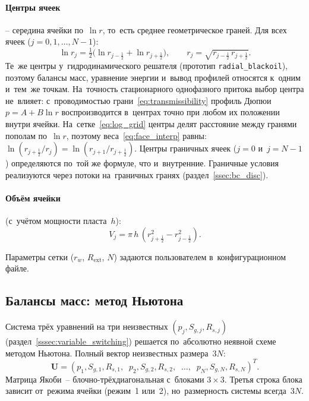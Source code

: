 \documentclass[12pt,a4paper]{article}
\newcommand{\half}{\tfrac{1}{2}}
\newcommand{\rw}{r_w}
\newcommand{\Rext}{R_{\mathrm{ext}}}
\begin{document}
\paragraph{Центры ячеек}
-- середина ячейки по~$\ln r$, то~есть среднее геометрическое
граней. Для всех ячеек ($j = 0, 1, \ldots, N-1$):
\begin{equation}\label{eq:cell_center}
  \ln r_j = \tfrac{1}{2}\bigl(\ln r_{j-\half} + \ln r_{j+\half}\bigr),
  \qquad
  r_j = \sqrt{r_{j-\half}\,r_{j+\half}}.
\end{equation}
Те~же центры у~гидродинамического решателя (прототип
\texttt{radial\_blackoil}), поэтому балансы масс, уравнение энергии
и~вывод профилей относятся к~одним и~тем~же точкам. На~точность
стационарного однофазного притока выбор центра не~влияет: с~проводимостью
грани~\eqref{eq:transmissibility} профиль Дюпюи $p = A + B\ln r$
воспроизводится в~центрах точно при любом их положении внутри
ячейки. На~сетке~\eqref{eq:log_grid} центры делят расстояние между
гранями пополам по~$\ln r$, поэтому веса~\eqref{eq:face_interp}
равны: $\ln(r_{j+\half}/r_j) = \ln(r_{j+1}/r_{j+\half})$.
Центры граничных ячеек ($j = 0$ и~$j = N{-}1$) определяются
по~той же формуле, что и~внутренние. Граничные условия
реализуются через потоки на~граничных гранях
(раздел~\ref{ssec:bc_disc}).

\paragraph{Объём ячейки} (с~учётом мощности пласта~$h$):
\begin{equation}\label{eq:volume}
  V_j = \pi\,h\,(r_{j+\half}^2 - r_{j-\half}^2).
\end{equation}

Параметры сетки ($\rw$, $\Rext$, $N$) задаются пользователем
в~конфигурационном файле.


\subsection{Балансы масс: метод Ньютона}\label{ssec:pressure_disc}

Система трёх уравнений на три неизвестных $(p_j, S_{g,j}, R_{s,j})$
(раздел~\ref{sssec:variable_switching}) решается по~абсолютно неявной
схеме методом Ньютона. Полный вектор неизвестных размера~$3N$:
\[
  \mathbf{U} = (p_1, S_{g,1}, R_{s,1},\;\;
                p_2, S_{g,2}, R_{s,2},\;\; \ldots,\;\;
                p_N, S_{g,N}, R_{s,N})^T.
\]
Матрица Якоби~-- блочно-трёхдиагональная с~блоками $3\times 3$.
Третья строка блока зависит от~режима ячейки (режим~1 или~2),
но~размерность системы всегда~$3N$.
\end{document}
